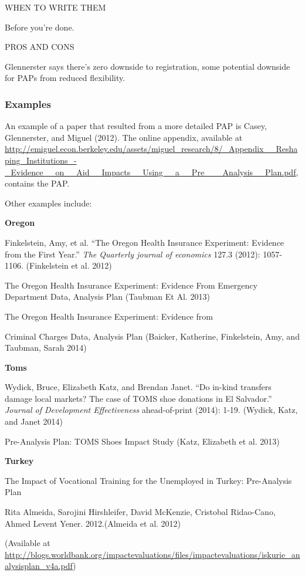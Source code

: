 \documentclass[12pt] {article}
\begin{document}
WHEN TO WRITE THEM

Before you're done.

PROS AND CONS

Glennerster says there's zero downside to registration, some potential
downside for PAPs from reduced flexibility.

\subsubsection{Examples}\label{examples}

An example of a paper that resulted from a more detailed PAP is Casey,
Glennerster, and Miguel (2012). The online appendix, available at
\url{http://emiguel.econ.berkeley.edu/assets/miguel_research/8/_Appendix__Reshaping_Institutions_-_Evidence__on__Aid__Impacts__Using__a__Pre___Analysis__Plan.pdf},
contains the PAP.

Other examples include:

\textbf{Oregon}

Finkelstein, Amy, et al. ``The Oregon Health Insurance Experiment:
Evidence from the First Year.'' \emph{The Quarterly journal of
economics} 127.3 (2012): 1057-1106. (Finkelstein et al. 2012)

The Oregon Health Insurance Experiment: Evidence From Emergency
Department Data, Analysis Plan (Taubman Et Al. 2013)

The Oregon Health Insurance Experiment: Evidence from

Criminal Charges Data, Analysis Plan (Baicker, Katherine, Finkelstein,
Amy, and Taubman, Sarah 2014)

\textbf{Toms}

Wydick, Bruce, Elizabeth Katz, and Brendan Janet. ``Do in-kind transfers
damage local markets? The case of TOMS shoe donations in El Salvador.''
\emph{Journal of Development Effectiveness} ahead-of-print (2014): 1-19.
(Wydick, Katz, and Janet 2014)

Pre-Analysis Plan: TOMS Shoes Impact Study (Katz, Elizabeth et al. 2013)

\textbf{Turkey}

The Impact of Vocational Training for the Unemployed in Turkey:
Pre-Analysis Plan

Rita Almeida, Sarojini Hirshleifer, David McKenzie, Cristobal
Ridao-Cano, Ahmed Levent Yener. 2012.(Almeida et al. 2012)

(Available at
\url{http://blogs.worldbank.org/impactevaluations/files/impactevaluations/iskurie_analysisplan_v4a.pdf})
\end{document}
